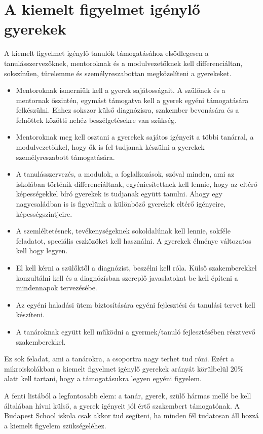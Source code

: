 \section{A kiemelt figyelmet igénylő gyerekek}
\label{sec:kiemelt_figyelem}

A kiemelt figyelmet igénylő tanulók támogatásához  elsődlegesen a tanulásszervezőknek, mentoroknak és a modulvezetőknek kell differenciáltan, sokszínűen, türelemme és személyreszabottan megközelíteni a gyerekeket.

\begin{itemize}
      \item Mentoroknak ismerniük kell a gyerek sajátosságait. A szülőnek és a mentornak őszintén, egymást támogatva kell a gyerek egyéni támogatására felkészülni. Ehhez sokszor külső diagnózisra, szakember bevonására és a felnőttek közötti nehéz beszélgetésekre van szükség.
      \item Mentoroknak meg kell osztani a gyerekek sajátos igényeit a többi tanárral, a modulvezetőkkel, hogy ők is fel tudjanak készülni a gyerekek személyreszabott támogatására.
      \item A tanulásszervezés, a modulok, a foglalkozások, szóval minden, ami az iskolában történik  differenciáltnak, egyéniesítettnek kell lennie, hogy az eltérő képességekkel bíró gyerekek is tudjanak együtt tanulni. Ahogy egy nagycsaládban is is figyelünk a különböző gyerekek eltérő igényeire, képességszintjeire.
      \item A szemléltetésnek, tevékenységeknek sokoldalúnak kell lennie, sokféle feladatot, speciális eszközöket kell használni. A gyerekek élménye változatos kell hogy legyen.
      \item El kell kérni a szülőktől a diagnózist, beszélni kell róla. Külső szakemberekkel konzultálni kell és a diagnózísban szereplő javaslatokat be kell építeni a mindennapok tervezésébe.
      \item Az egyéni haladási ütem biztosítására egyéni fejlesztési és tanulási tervet kell készíteni.
      \item A tanároknak együtt kell működni a gyermek/tanuló fejlesztésében résztvevő szakemberekkel.
\end{itemize}

Ez sok feladat, ami a tanárokra, a csoportra nagy terhet tud róni. Ezért a mikroiskolákban a kiemelt figyelmet igénylő gyerekek arányát körülbelül 20\% alatt kell tartani, hogy a támogatásukra legyen egyéni figyelem.

A fenti listából a legfontosabb elem: a tanár, gyerek, szülő hármas mellé be kell általában hívni külső, a gyerek igényeit jól értő szakembert támogatónak. A Budapest School iskola csak akkor tud segíteni, ha minden fél tudatosan áll hozzá a kiemelt figyelem szükségeléhez.